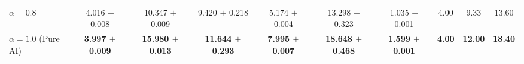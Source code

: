 \begin{table}[t]
\begin{tabular}{@{}lccccccccc@{}}
$\alpha = 0.8$ & 4.016 $\pm$ 0.008 & 10.347 $\pm$ 0.009 & 9.420 $\pm$ 0.218 & 5.174 $\pm$ 0.004 & 13.298 $\pm$ 0.323 & 1.035 $\pm$ 0.001 & 4.00 & 9.33 & 13.60 \\
$\alpha = 1.0$ (Pure AI) & \textbf{3.997 $\pm$ 0.009} & \textbf{15.980 $\pm$ 0.013} & \textbf{11.644 $\pm$ 0.293} & \textbf{7.995 $\pm$ 0.007} & \textbf{18.648 $\pm$ 0.468} & \textbf{1.599 $\pm$ 0.001} & \textbf{4.00} & \textbf{12.00} & \textbf{18.40} \\
\bottomrule
\end{tabular}
\label{tab:macro_results}
\end{table}